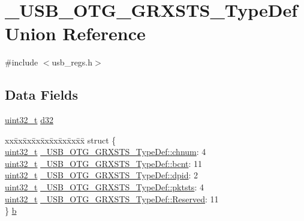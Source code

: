\hypertarget{union___u_s_b___o_t_g___g_r_x_s_t_s___type_def}{\section{\-\_\-\-U\-S\-B\-\_\-\-O\-T\-G\-\_\-\-G\-R\-X\-S\-T\-S\-\_\-\-Type\-Def Union Reference}
\label{union___u_s_b___o_t_g___g_r_x_s_t_s___type_def}
}


{\ttfamily \#include $<$usb\-\_\-regs.\-h$>$}

\subsection*{Data Fields}
\begin{DoxyCompactItemize}
\item 
\hyperlink{stdint_8h_a435d1572bf3f880d55459d9805097f62}{uint32\-\_\-t} \hyperlink{group___u_s_b___o_t_g___d_r_i_v_e_r_gab071a096d316aba8721b227e86994e8d}{d32}
\item 
\begin{tabbing}
xx\=xx\=xx\=xx\=xx\=xx\=xx\=xx\=xx\=\kill
struct \{\\
\>\hyperlink{stdint_8h_a435d1572bf3f880d55459d9805097f62}{uint32\_t} \hyperlink{group___u_s_b___o_t_g___d_r_i_v_e_r_gad13bf9b9a5b51b6001dc3b898a936845}{\_USB\_OTG\_GRXSTS\_TypeDef::chnum}: 4\\
\>\hyperlink{stdint_8h_a435d1572bf3f880d55459d9805097f62}{uint32\_t} \hyperlink{group___u_s_b___o_t_g___d_r_i_v_e_r_gaf3069e9e6cdea3892dc19c9b53f539a6}{\_USB\_OTG\_GRXSTS\_TypeDef::bcnt}: 11\\
\>\hyperlink{stdint_8h_a435d1572bf3f880d55459d9805097f62}{uint32\_t} \hyperlink{group___u_s_b___o_t_g___d_r_i_v_e_r_gaa694a3bd21aec4905205948d31e5576c}{\_USB\_OTG\_GRXSTS\_TypeDef::dpid}: 2\\
\>\hyperlink{stdint_8h_a435d1572bf3f880d55459d9805097f62}{uint32\_t} \hyperlink{group___u_s_b___o_t_g___d_r_i_v_e_r_ga686db23028035b8ec903aaedd0f1e3c1}{\_USB\_OTG\_GRXSTS\_TypeDef::pktsts}: 4\\
\>\hyperlink{stdint_8h_a435d1572bf3f880d55459d9805097f62}{uint32\_t} \hyperlink{group___u_s_b___o_t_g___d_r_i_v_e_r_gac6ed8ae7244e39a9103516aaa72d4437}{\_USB\_OTG\_GRXSTS\_TypeDef::Reserved}: 11\\
\} \hyperlink{group___u_s_b___o_t_g___d_r_i_v_e_r_gad746c43da68af26662793c5c15a5c0a1}{b}\\

\end{tabbing}\end{DoxyCompactItemize}



